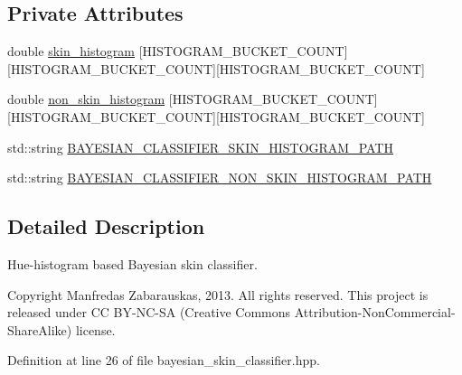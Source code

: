 \subsection*{\-Private \-Attributes}
\begin{DoxyCompactItemize}
\item 
double \hyperlink{class_r_p_bayesian_skin_classifier_a8fc9e22b862078ebfb15f678a03b6e24}{skin\-\_\-histogram} \mbox{[}\-H\-I\-S\-T\-O\-G\-R\-A\-M\-\_\-\-B\-U\-C\-K\-E\-T\-\_\-\-C\-O\-U\-N\-T\mbox{]}\mbox{[}\-H\-I\-S\-T\-O\-G\-R\-A\-M\-\_\-\-B\-U\-C\-K\-E\-T\-\_\-\-C\-O\-U\-N\-T\mbox{]}\mbox{[}\-H\-I\-S\-T\-O\-G\-R\-A\-M\-\_\-\-B\-U\-C\-K\-E\-T\-\_\-\-C\-O\-U\-N\-T\mbox{]}
\item 
double \hyperlink{class_r_p_bayesian_skin_classifier_ae52ae113f5560fcee165cbeffc3e1892}{non\-\_\-skin\-\_\-histogram} \mbox{[}\-H\-I\-S\-T\-O\-G\-R\-A\-M\-\_\-\-B\-U\-C\-K\-E\-T\-\_\-\-C\-O\-U\-N\-T\mbox{]}\mbox{[}\-H\-I\-S\-T\-O\-G\-R\-A\-M\-\_\-\-B\-U\-C\-K\-E\-T\-\_\-\-C\-O\-U\-N\-T\mbox{]}\mbox{[}\-H\-I\-S\-T\-O\-G\-R\-A\-M\-\_\-\-B\-U\-C\-K\-E\-T\-\_\-\-C\-O\-U\-N\-T\mbox{]}
\item 
std\-::string \hyperlink{class_r_p_bayesian_skin_classifier_a09d5b969dc025f89b5b7765d5af5bea2}{\-B\-A\-Y\-E\-S\-I\-A\-N\-\_\-\-C\-L\-A\-S\-S\-I\-F\-I\-E\-R\-\_\-\-S\-K\-I\-N\-\_\-\-H\-I\-S\-T\-O\-G\-R\-A\-M\-\_\-\-P\-A\-T\-H}
\item 
std\-::string \hyperlink{class_r_p_bayesian_skin_classifier_ae4ccd3d0c9db15a28c99eed60fcf95f7}{\-B\-A\-Y\-E\-S\-I\-A\-N\-\_\-\-C\-L\-A\-S\-S\-I\-F\-I\-E\-R\-\_\-\-N\-O\-N\-\_\-\-S\-K\-I\-N\-\_\-\-H\-I\-S\-T\-O\-G\-R\-A\-M\-\_\-\-P\-A\-T\-H}
\end{DoxyCompactItemize}


\subsection{\-Detailed \-Description}
\-Hue-\/histogram based \-Bayesian skin classifier. 

\begin{DoxyCopyright}{\-Copyright}
\-Manfredas \-Zabarauskas, 2013. \-All rights reserved. \-This project is released under \-C\-C \-B\-Y-\/\-N\-C-\/\-S\-A (\-Creative \-Commons \-Attribution-\/\-Non\-Commercial-\/\-Share\-Alike) license. 
\end{DoxyCopyright}


\-Definition at line 26 of file bayesian\-\_\-skin\-\_\-classifier.\-hpp.



